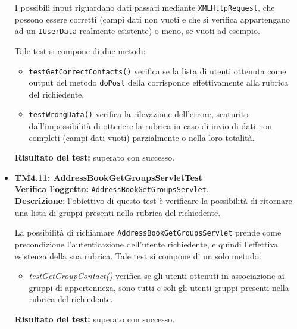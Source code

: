 \begin{itemize}
I possibili input riguardano dati passati mediante \texttt{XMLHttpRequest}, che possono essere corretti (campi dati non vuoti e che si verifica appartengano ad un \texttt{IUserData} realmente esistente) o meno, se vuoti ad esempio.

Tale test si compone di due metodi:
\begin{itemize}
\item \texttt{testGetCorrectContacts()} verifica se la lista di utenti ottenuta come output del metodo \texttt{doPost} della  corrisponde effettivamente alla rubrica del richiedente.
\item \texttt{testWrongData()} verifica la rilevazione dell'errore, scaturito dall'impossibilità di ottenere la rubrica in caso di invio di dati non completi (campi dati vuoti) parzialmente o nella loro totalità.
\end{itemize}
\textbf{Risultato del test:} superato con successo.

\item \textbf{TM4.11: AddressBookGetGroupsServletTest}\\
\textbf{Verifica l'oggetto:} \texttt{AddressBookGetGroupsServlet}.\\
\textbf{Descrizione}: l'obiettivo di questo test è verificare la possibilità di ritornare una lista di gruppi presenti nella rubrica del richiedente.

La possibilità di richiamare \texttt{AddressBookGetGroupsServlet} prende come precondizione l'autenticazione dell'utente richiedente, e quindi l'effettiva esistenza della sua rubrica.
Tale test si compone di un solo metodo:
\begin{itemize}
\item \textit{testGetGroupContact()} verifica se gli utenti ottenuti in associazione ai gruppi di appertenneza, sono tutti e soli gli utenti-gruppi presenti nella rubrica del richiedente.
\end{itemize}
\textbf{Risultato del test:} superato con successo.
\end{itemize}

